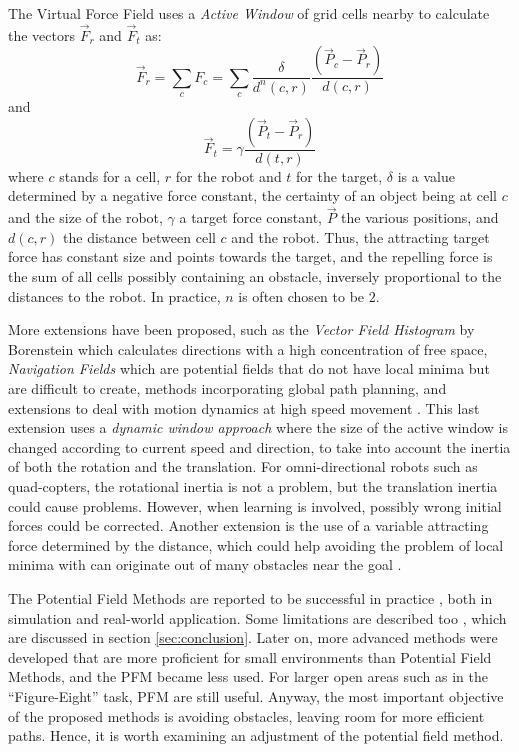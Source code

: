 \documentclass[11pt]{article}
\begin{document}
The Virtual Force Field uses a \emph{Active Window} of grid cells nearby to calculate the vectors $\vec{F}_r$ and $\vec{F}_t$ as:
  \[ \vec{F}_r = \sum_{c} F_{c} = \sum_{c} \frac{\delta}{d^n(c, r)} \frac{(\vec{P}_c - \vec{P}_r)}{ d(c, r) } \]
and
  \[ \vec{F}_t = \gamma \frac{(\vec{P}_t - \vec{P}_r)}{ d(t, r) } \]
where $c$ stands for a cell, $r$ for the robot and $t$ for the target, $\delta$ is a value determined by a negative force constant, the certainty of an object being at cell $c$ and the size of the robot, $\gamma$ a target force constant, $\vec{P}$ the various positions, and $d(c, r)$ the distance between cell $c$ and the robot. Thus, the attracting target force has constant size and points towards the target, and the repelling force is the sum of all cells possibly containing an obstacle, inversely proportional to the distances to the robot. In practice, $n$ is often chosen to be $2$.

More extensions have been proposed, such as the \emph{Vector Field Histogram} by Borenstein which calculates directions with a high concentration of free space, \emph{Navigation Fields} which are potential fields that do not have local minima but are difficult to create, methods incorporating global path planning, and extensions to deal with motion dynamics at high speed movement \cite{burgard97}. This last extension uses a \emph{dynamic window approach} where the size of the active window is changed according to current speed and direction, to take into account the inertia of both the rotation and the translation. For omni-directional robots such as quad-copters, the rotational inertia is not a problem, but the translation inertia could cause problems. However, when learning is involved, possibly wrong initial forces could be corrected. Another extension is the use of a variable attracting force determined by the distance, which could help avoiding the problem of local minima with can originate out of many obstacles near the goal \cite{ge00}.

The Potential Field Methods are reported to be successful in practice \cite{brooks86, koren91, burgard99}, both in simulation and real-world application. Some limitations are described too \cite{koren91}, which are discussed in section \ref{sec:conclusion}. Later on, more advanced methods were developed that are more proficient for small environments than Potential Field Methods, and the PFM became less used. For larger open areas such as in the ``Figure-Eight'' task, PFM are still useful. Anyway, the most important objective of the proposed methods is avoiding obstacles, leaving room for more efficient paths. Hence, it is worth examining an adjustment of the potential field method.
\end{document}
